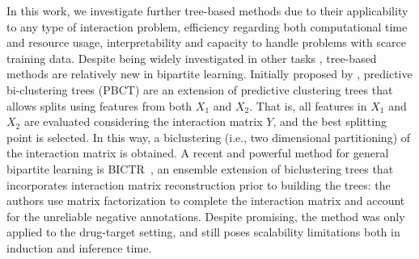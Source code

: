 \documentclass[sn-mathphys-num]{sn-jnl}%
\theoremstyle{thmstyleone}%
\theoremstyle{thmstyletwo}%
\theoremstyle{thmstylethree}%
\begin{document}
In this work, we investigate further tree-based methods due to their applicability to any type of interaction problem, efficiency regarding both 
computational time and resource usage, interpretability and capacity to handle problems with scarce training data.  
Despite being widely investigated in other tasks \cite{costa2023recent}, tree-based methods are relatively new in bipartite learning. Initially proposed by \citet{pliakos_global_2018}, predictive bi-clustering trees (PBCT) are an extension of predictive clustering trees \cite{blockeel1998top} that allows splits using features from both $X_1$ and $X_2$. That is, all features in $X_1$ and $X_2$ are evaluated considering the interaction matrix $Y$, and the best splitting point is selected. In this way, a biclustering (i.e., two dimensional partitioning) of the interaction matrix is obtained.
A recent and powerful method for general bipartite learning is BICTR~\cite{pliakos_drug-target_2020}, an ensemble extension of biclustering trees that incorporates interaction matrix reconstruction prior to building the trees: the authors use matrix factorization to complete the interaction matrix and account for the unreliable negative annotations. %
Despite promising, the method was only applied to the drug-target setting, and still poses scalability limitations both in induction and inference time. 
\end{document}
